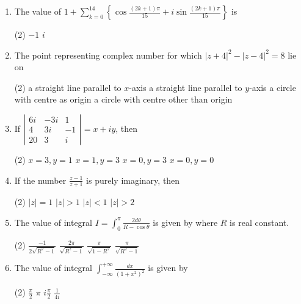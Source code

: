 \begin{enumerate}
\begin{tasks}
	\end{tasks}
	\item The value of $1+\sum_{k=0}^{14}\left\{\cos \frac{(2 k+1) \pi}{15}+i \sin \frac{(2 k+1) \pi}{15}\right\}$ is
	 \begin{tasks}(2)
		\task[\textbf{b.}] $-1$
		\task[\textbf{d.}] $i$
	\end{tasks}
	\item The point representing complex number for which $|z+4|^{2}-|z-4|^{2}=8$ lie on
	 \begin{tasks}(2)
		\task[\textbf{a.}]a straight line parallel to $x$-axis
		\task[\textbf{b.}]a straight line parallel to $y$-axis
		\task[\textbf{c.}]a circle with centre as origin
		\task[\textbf{d.}] a circle with centre other than origin
	\end{tasks}
	\item If $\left|\begin{array}{ccc}6 i & -3 i & 1 \\ 4 & 3 i & -1 \\ 20 & 3 & i\end{array}\right|=x+i y$, then
	 \begin{tasks}(2)
		\task[\textbf{a.}] $x=3, y=1$
		\task[\textbf{b.}] $x=1, y=3$
		\task[\textbf{c.}]$x=0, y=3$
		\task[\textbf{d.}]  $x=0, y=0$
	\end{tasks}
	\item If the number $\frac{z-1}{z+1}$ is purely imaginary, then
	 \begin{tasks}(2)
		\task[\textbf{a.}]$|z|=1$
		\task[\textbf{b.}]$|z|>1$
		\task[\textbf{c.}]$|z|<1$
		\task[\textbf{d.}] $|z|>2$
	\end{tasks}
	\item The value of integral $I=\int_{0}^{\pi} \frac{2 d \theta}{R-\cos \theta}$ is given by where $R$ is real constant.
	\begin{tasks}(2)
		\task[\textbf{a.}]$\frac{-1}{2 \sqrt{R^{2}-1}}$
		\task[\textbf{b.}]$\frac{2 \pi}{\sqrt{R^{2}-1}}$
		\task[\textbf{c.}]$\frac{\pi}{\sqrt{1-R^{2}}}$
		\task[\textbf{d.}] $\frac{\pi}{\sqrt{R^{2}-1}}$
	\end{tasks}
	\item The value of integral $\int_{-\infty}^{+\infty} \frac{d x}{\left(1+x^{2}\right)^{2}}$ is given by
	\begin{tasks}(2)
		\task[\textbf{a.}]$\frac{\pi}{2}$
		\task[\textbf{b.}]$\pi$
		\task[\textbf{c.}] $i \frac{\pi}{2}$
		\task[\textbf{d.}]  $\frac{1}{4 i}$
	\end{tasks}

\end{enumerate}

